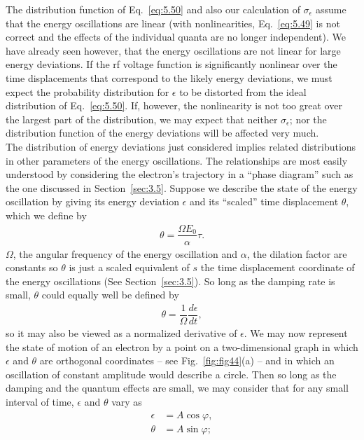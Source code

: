 The distribution function of Eq.~\eqref{eq:5.50} and also our calculation of $\sigma_\epsilon$ assume that the energy oscillations are linear (with nonlinearities, Eq.~\eqref{eq:5.49} is not
correct and the effects of the individual quanta are no longer independent). We have already seen however, that the energy oscillations are not linear for large energy deviations. If the rf voltage function is significantly nonlinear over the time displacements that correspond to the likely energy deviations, we must expect the probability distribution for $\epsilon$ to be distorted from the ideal distribution of Eq.~\eqref{eq:5.50}. If, however, the nonlinearity
 is not too great over the largest part of the distribution, we may expect that neither $\sigma_\epsilon$; nor the distribution function of the energy deviations will be affected very much.\\
The distribution of energy deviations just considered implies related distributions in other parameters of the energy oscillations. The relationships are most easily understood by considering the electron's trajectory in a ``phase diagram'' such as the one discussed in Section~\ref{sec:3.5}. Suppose we describe the state of the energy oscillation by giving its energy deviation $\epsilon$ and its ``scaled'' time displacement $\theta$, which we define by
\begin{align} \label{eq:5.52}
	\theta = \dfrac{\Omega E_0}{\alpha} \tau.
\end{align}
$\Omega$, the angular frequency of the energy oscillation and $\alpha$, the dilation factor are
constants so $\theta$ is just a scaled equivalent of $s$ the time displacement coordinate of
the energy oscillations (See Section~\ref{sec:3.5}). So long as the damping rate is small, $\theta$ could equally well be defined by
\begin{align}
	\theta = \dfrac{1}{\Omega} \dfrac{d\epsilon}{dt},
\end{align}
so it may also be viewed as a normalized derivative of $\epsilon$. We may now represent the state of motion of an electron by a point on a two-dimensional graph in which $\epsilon$ and $\theta$ are orthogonal coordinates -- see Fig.~\ref{fig:fig44}(a) -- and in which an oscillation
of constant amplitude would describe a circle. Then so long as the damping and the quantum effects are small, we may consider that for any small interval of time, $\epsilon$ and $\theta$ vary as
\begin{align}
	\epsilon &= A \cos\varphi,\\
    \theta &= A \sin\varphi;
\end{align}
